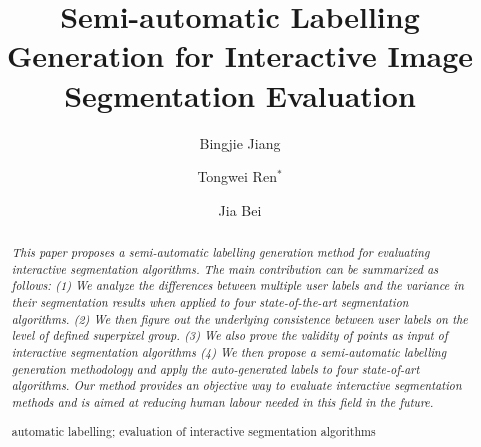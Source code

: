 \documentclass[runningheads,a4paper]{llncs}
\newcommand{\keywords}[1]{\par\addvspace\baselineskip
\noindent\keywordname\enspace\ignorespaces#1}
\begin{document}
\mainmatter  %

\title{Semi-automatic Labelling Generation for Interactive Image Segmentation Evaluation}


%
%
\author{Bingjie Jiang \and Tongwei Ren$^{*}$ \and Jia Bei}
%


\maketitle


\begin{abstract}
\emph{This paper proposes a semi-automatic labelling generation method for evaluating interactive segmentation algorithms. The main contribution can be summarized as follows: (1) We analyze the differences between multiple user labels and the variance in their segmentation results when applied to four state-of-the-art segmentation algorithms. (2) We then figure out the underlying consistence between user labels on the level of defined superpixel group. (3) We also prove the validity of points as input of interactive segmentation algorithms (4) We then propose a semi-automatic labelling generation methodology and apply the auto-generated labels to four state-of-art algorithms. Our method provides an objective way to evaluate interactive segmentation methods and is aimed at reducing human labour needed in this field in the future.
}

\keywords{automatic labelling; evaluation of interactive segmentation algorithms}
\end{abstract}
\end{document}
